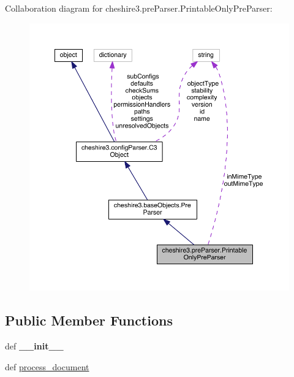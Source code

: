 Collaboration diagram for cheshire3.\-pre\-Parser.\-Printable\-Only\-Pre\-Parser\-:
\nopagebreak
\begin{figure}[H]
\begin{center}
\leavevmode
\includegraphics[width=350pt]{classcheshire3_1_1pre_parser_1_1_printable_only_pre_parser__coll__graph}
\end{center}
\end{figure}
\subsection*{Public Member Functions}
\begin{DoxyCompactItemize}
\item 
\hypertarget{classcheshire3_1_1pre_parser_1_1_printable_only_pre_parser_afa33ae4286ffa86702f0199eafe58404}{def {\bfseries \-\_\-\-\_\-init\-\_\-\-\_\-}}\label{classcheshire3_1_1pre_parser_1_1_printable_only_pre_parser_afa33ae4286ffa86702f0199eafe58404}

\item 
def \hyperlink{classcheshire3_1_1pre_parser_1_1_printable_only_pre_parser_a6599d96c803e65225932f1a07e4d4290}{process\-\_\-document}
\end{DoxyCompactItemize}
